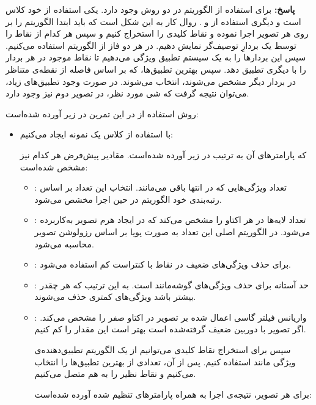 \documentclass[12pt,a4paper]{article}
\theoremstyle{definition}
\theoremstyle{theorem}
\theoremstyle{definition}
\begin{document}
\textbf{پاسخ:}
برای استفاده از الگوریتم  در  دو روش وجود دارد. یکی استفاده از خود کلاس  است و دیگری استفاده از  و . روال کار به این شکل است که باید ابتدا الگوریتم را بر روی هر تصویر اجرا نموده و نقاط کلیدی را استخراج کنیم و سپس هر کدام از نقاط را توسط یک بردارِ توصیف‌گر نمایش دهیم. در هر دو فاز از الگوریتم  استفاده می‌کنیم. سپس این بردارها را به یک سیستم تطبیق ویژگی می‌دهیم تا نقاط موجود در هر بردار را با دیگری تطبیق دهد. سپس بهترین تطبیق‌ها، که بر اساس فاصله از نقطه‌ی متناظر در بردار دیگر مشخص می‌شوند، انتخاب می‌شوند. در صورت وجود تطبیق‌های زیاد، می‌توان نتیجه گرفت که شی مورد نظر، در تصویر دوم نیز وجود دارد.

روش استفاده از  در این تمرین در زیر آورده شده‌است:‌
\begin{itemize}
\renewcommand{\labelitemi}{$\circ$}
\item 
با استفاده از کلاس  یک نمونه ایجاد می‌کنیم: 

که پارامترهای آن به ترتیب در زیر آورده شده‌است. مقادیر پیش‌فرض هر کدام نیز مشخص شده‌است:
\begin{itemize}
\renewcommand{\labelitemii}{$\bullet$}
\item 
{} : 
تعداد ویژگی‌هایی که در انتها باقی می‌مانند. انتخاب این تعداد بر اساس رتبه‌بندی خود الگوریتم در حین اجرا مخشص می‌شود.
\item 
{} : 
تعداد لایه‌ها در هر اکتاو را مشخص می‌کند که در ایجاد هرم تصویر به‌کاربرده می‌شود. در الگوریتم اصلی\cite{sift} این تعداد به صورت پویا بر اساس رزولوشن تصویر محاسبه می‌شود.
\item 
{} : 
برای حذف ویژگی‌های ضعیف در نقاط با کنتراست کم استفاده می‌شود.
\item 
{} : 
حد آستانه‌ برای حذف ویژگی‌‌های گوشه‌مانند است. به این ترتیب که هر چقدر بیشتر باشد ویژگی‌های کمتری حذف می‌شوند. 
\item 
{} : 
واریانس فیلتر گاسی اعمال شده بر تصویر در اکتاو صفر را مشخص می‌کند. اگر تصویر با دوربین ضعیف گرفته‌شده است بهتر است این مقدار را کم کنیم. 

سپس برای استخراج نقاط کلیدی می‌توانیم از یک الگوریتم تطبیق‌دهنده‌ی ویژگی مانند  استفاده کنیم. پس از آن، تعدادی از بهترین تطبیق‌ها را انتخاب می‌کنیم و نقاط نظیر را به هم متصل می‌کنیم.

برای هر تصویر، نتیجه‌ی اجرا به همراه پارامترهای تنظیم شده آورده شده‌است: 
 
\end{itemize}
\end{itemize}
\end{document}
